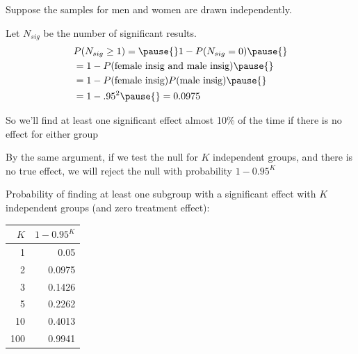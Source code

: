 \documentclass[11pt,english,handout]{beamer}
\newenvironment{wideitemize}{\itemize\addtolength{\itemsep}{10pt}}{\enditemize}
\begin{document}
\begin{frame}
	\begin{wideitemize}
		\item 
		Suppose the samples for men and women are drawn independently. 
		
		\item
		Let $N_{sig}$ be the number of significant results.
		\begin{align*}
		&P( N_{sig} \geq 1  ) = \pause{} 1 - P(N_{sig} =0)  \pause{} \\
		&= 1 - P(\text{female insig and male insig}) \pause{} \\
		& = 1 -P(\text{female insig}) P(\text{male insig}) \pause{} \\ 
		& = 1-.95^2 \pause{} =  0.0975
		\end{align*}
	
	\item
	So we'll find at least one significant effect almost 10\% of the time if there is no effect for either group
	
	\pause
	\item
	By the same argument, if we test the null for $K$ independent groups, and there is no true effect, we will reject the null with probability \pause $1 - 0.95^K$
\end{wideitemize}
\end{frame}


\begin{frame}
Probability of finding at least one subgroup with a significant effect with $K$ independent groups (and zero treatment effect):	\\
		\begin{tabular}{rr}
		$K$& $1-0.95^K$ \\ \hline 
		1 & 0.05 \\
		2 & 0.0975 \\ \pause{}
		3 & \pause{} 0.1426 \\
		5 &\pause{} 0.2262 \\
		10 & \pause{} 0.4013\\
		100 & \pause{} 0.9941
	\end{tabular}

\end{frame}
\end{document}
